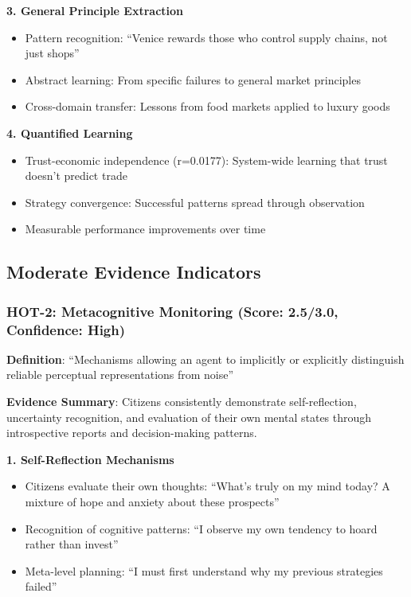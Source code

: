 \documentclass[12pt,a4paper]{article}
\begin{document}
\textbf{3. General Principle Extraction}
\begin{itemize}
    \item Pattern recognition: ``Venice rewards those who control supply chains, not just shops''
    \item Abstract learning: From specific failures to general market principles
    \item Cross-domain transfer: Lessons from food markets applied to luxury goods
\end{itemize}

\textbf{4. Quantified Learning}
\begin{itemize}
    \item Trust-economic independence (r=0.0177): System-wide learning that trust doesn't predict trade
    \item Strategy convergence: Successful patterns spread through observation
    \item Measurable performance improvements over time
\end{itemize}

\subsection{Moderate Evidence Indicators}

\subsubsection{HOT-2: Metacognitive Monitoring (Score: 2.5/3.0, Confidence: High)}

\textbf{Definition}: ``Mechanisms allowing an agent to implicitly or explicitly distinguish reliable perceptual representations from noise''

\textbf{Evidence Summary}: Citizens consistently demonstrate self-reflection, uncertainty recognition, and evaluation of their own mental states through introspective reports and decision-making patterns.

\textbf{1. Self-Reflection Mechanisms}
\begin{itemize}
    \item Citizens evaluate their own thoughts: ``What's truly on my mind today? A mixture of hope and anxiety about these prospects''
    \item Recognition of cognitive patterns: ``I observe my own tendency to hoard rather than invest''
    \item Meta-level planning: ``I must first understand why my previous strategies failed''
\end{itemize}
\end{document}
